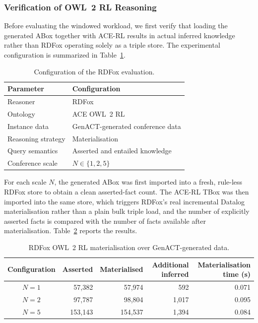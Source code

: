 \subsubsection{Verification of OWL~2 RL Reasoning}
\label{subsubsec:genact-rdfox-verification}

Before evaluating the windowed workload, we first verify that loading the
generated ABox together with ACE-RL results in actual inferred knowledge
rather than RDFox operating solely as a triple store. The experimental
configuration is summarized in Table~\ref{tab:genact-rdfox-setup}.

\begin{table}[htbp]
    \centering
    \caption{Configuration of the RDFox evaluation.}
    \label{tab:genact-rdfox-setup}
    \begin{tabular}{ll}
        \toprule
        \textbf{Parameter} & \textbf{Configuration} \\
        \midrule
        Reasoner             & RDFox \\
        Ontology             & ACE OWL~2 RL \\
        Instance data        & GenACT-generated conference data \\
        Reasoning strategy   & Materialisation \\
        Query semantics      & Asserted and entailed knowledge \\
        Conference scale     & $N \in \{1, 2, 5\}$ \\
        \bottomrule
    \end{tabular}
\end{table}

For each scale $N$, the generated ABox was first imported into a fresh,
rule-less RDFox store to obtain a clean asserted-fact count. The ACE-RL TBox
was then imported into the same store, which triggers RDFox's real
incremental Datalog materialisation rather than a plain bulk triple load, and
the number of explicitly asserted facts is compared with the number of facts
available after materialisation. Table~\ref{tab:genact-rdfox-results} reports
the results.

\begin{table}[htbp]
\centering
\caption{RDFox OWL~2 RL materialisation over GenACT-generated data.}
\label{tab:genact-rdfox-results}
\small
\begin{tabular}{crrrr}
\toprule
\textbf{Configuration} &
\textbf{Asserted} &
\textbf{Materialised} &
\textbf{Additional inferred} &
\textbf{Materialisation time (s)} \\
\midrule

$N=1$ & 57{,}382  & 57{,}974  & 592     & 0.071 \\
$N=2$ & 97{,}787  & 98{,}804  & 1{,}017 & 0.095 \\
$N=5$ & 153{,}143 & 154{,}537 & 1{,}394 & 0.084 \\

\bottomrule
\end{tabular}
\end{table}

